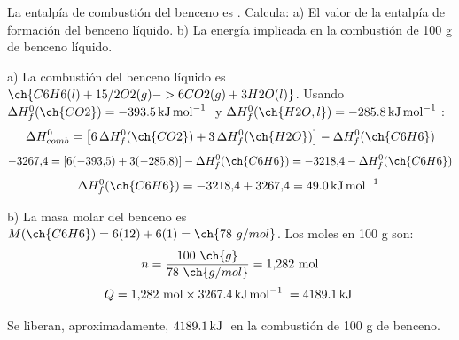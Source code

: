 \begin{exercise}
    La entalpía de combustión del benceno es . Calcula: a) El valor de la entalpía de formación del benceno líquido. b) La energía implicada en la combustión de 100 g
    de benceno líquido.


    \begin{solu}


        a) La combustión del benceno líquido es \(\ch{C6H6 (l) + 15/2 O2 (g) -> 6 CO2 (g) + 3 H2O (l)}\). Usando \(\Delta H^0_f (\ch{CO2}) = \energia[kjmol]{-393,5}\) y \(\Delta H^0_f (\ch{H2O, l}) = \energia[kjmol]{-285,8}\):
        \[
            \Delta H^0_{comb} = \left[6\,\Delta H^0_f(\ch{CO2}) + 3\,\Delta H^0_f(\ch{H2O})\right] - \Delta H^0_f(\ch{C6H6})
        \]
        \[
            -3267{,}4 = \left[6(-393{,}5)+3(-285{,}8)\right] - \Delta H^0_f(\ch{C6H6}) = -3218{,}4 - \Delta H^0_f(\ch{C6H6})
        \]
        \[
            \Delta H^0_f(\ch{C6H6}) = -3218{,}4 + 3267{,}4 = \energia[kjmol]{49,0}
        \]

        b) La masa molar del benceno es \(M(\ch{C6H6}) = 6(12)+6(1) = \ch{78\ g/mol}\). Los moles en 100 g son:
        \[
            n = \frac{100\ \ch{g}}{78\ \ch{g/mol}} = 1{,}282\ \text{mol}
        \]
        \[
            Q = 1{,}282\ \text{mol} \times \energia[kjmol]{3267,4} = \energia[kj]{4189,1}
        \]

        Se liberan, aproximadamente, \(\energia[kj]{4189,1}\) en la combustión de 100 g de benceno.
    \end{solu}
\end{exercise}

